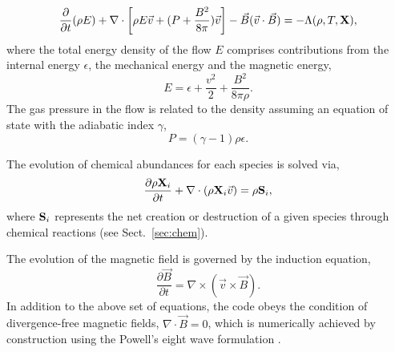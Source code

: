 \documentclass[useAMS,usenatbib]{mn2e}
\begin{document}
\begin{equation}\label{encons1}
\frac{\partial}{\partial t}(\rho E)
+ \nabla \cdot\left[ \rho E \vec{v} + (P + \frac{B^2}{8\pi})\vec{v}\right]  
- \vec{B}(\vec{v}\cdot\vec{B}) = -\Lambda(\rho,T,{\bf{X}}),
\end{equation}
%
%
where the total energy density of the flow $E$ comprises contributions from 
the internal energy $\epsilon$, the mechanical energy and the magnetic energy,
%
\begin{equation}\label{encons2}
 E = \epsilon + \frac{v^2}{2} + \frac{B^2}{8 \pi \rho}.
\end{equation}
The gas pressure in the flow is related to the density assuming an equation 
of state with the adiabatic index $\gamma$,
%
\begin{equation}\label{EOS}
P = (\gamma - 1) \rho \epsilon.
\end{equation}

The evolution of chemical abundances for each species is solved via,
%
\begin{equation}\label{chemevol}
\frac{\partial \rho{\bf{X}}_{i}}{\partial t} + \nabla \cdot (\rho
{\bf{X}}_{i} \vec{v})  = \rho {\bf{S}}_{i},
\end{equation}
where ${\bf{S}}_{i}$ represents the net creation or destruction of a
given species through chemical reactions (see Sect.~\ref{sec:chem}).

The evolution of the magnetic field is governed by the induction equation,
%
\begin{equation}\label{induction}
\frac{\partial \vec{B}}{\partial t} = \nabla \times \left(\vec{v}\times \vec{B}\right).
\end{equation}
%
In addition to the above set of equations, the code obeys the condition of divergence-free 
magnetic fields, $\nabla \cdot \vec{B} = 0$, which is numerically achieved by construction 
using the Powell's eight wave formulation \citep{Powell:1999p14822}.
\end{document}

